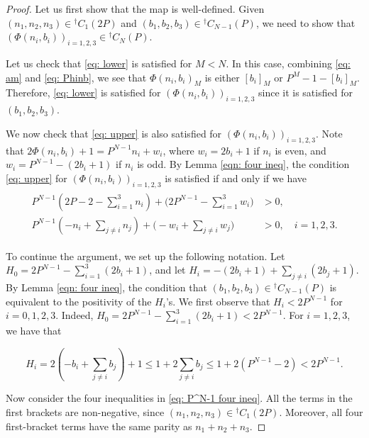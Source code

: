 \documentclass[10pt,a4paper]{amsart}
\begin{document}
\begin{proof}
    Let us first show that the map is well-defined.
    Given $(n_1,n_2,n_3)\in {}^\dagger C_1(2P)$ and $(b_1,b_2,b_3)\in {}^\dagger C_{N-1}(P)$, we need to show that $(\Phi(n_i,b_i))_{i=1,2,3}\in {}^\dagger C_N(P)$.

    Let us check that \eqref{eq: lower} is satisfied for $M<N$.
    In this case, combining \eqref{eq: am} and \eqref{eq: Phinb}, we see that $\Phi(n_i,b_i)_M$ is either $[b_i]_M$ or $P^M-1-[b_i]_M$.
    Therefore, \eqref{eq: lower} is satisfied for $(\Phi(n_i,b_i))_{i=1,2,3}$ since it is satisfied for $(b_1,b_2,b_3)$. 
    

    We now check that \eqref{eq: upper} is also satisfied for $(\Phi(n_i,b_i))_{i=1,2,3}$.
Note that  $2\Phi(n_i,b_i)+1=P^{N-1}n_i+w_i$, where $w_i=2b_i+1$ if $n_i$ is even, and $w_i=P^{N-1}-(2b_i+1)$ if $n_i$ is odd.
By Lemma \ref{eqn: four ineq}, the condition \eqref{eq: upper} for $(\Phi(n_i,b_i))_{i=1,2,3}$ is satisfied if and only if we have 
\begin{align}\label{eq: P^N-1 four ineq}
\begin{split}
    P^{N-1}(2P-2-\sum_{i=1}^3 n_i)+\Big(2P^{N-1}-\sum_{i=1}^3 w_i\Big)&>0,\\
    P^{N-1}(-n_i+\sum_{j\neq i}n_j)+\Big(-w_i+\sum_{j\neq i}w_j\Big)&>0,\quad i=1,2,3.
\end{split}
\end{align}


To continue the argument, we set up the following notation.
Let $H_0=2P^{N-1}-\sum_{i=1}^3(2b_i+1)$, and let $H_i=-(2b_i+1)+\sum_{j\neq i}(2b_j+1)$. 
By Lemma \ref{eqn: four ineq}, the condition that $(b_1,b_2,b_3)\in {}^\dagger C_{N-1}(P)$ is equivalent to the positivity of the $H_i$'s.
We first observe that $H_i<2P^{N-1}$ for $i=0,1,2,3$.  Indeed, $H_0=2P^{N-1}-\sum_{i=1}^3(2b_i+1)<2P^{N-1}$.
For $i=1,2,3$, we have that

\[H_i=2(-b_i+\sum_{j\neq i}b_j)+1\leq 1+2\sum_{j\neq i}b_j\leq 1+2(P^{N-1}-2)<2P^{N-1}.\]

Now consider the four inequalities in \eqref{eq: P^N-1 four ineq}.
All the terms in the first brackets are non-negative, since
$(n_1,n_2,n_3)\in{}^\dagger C_1(2P)$.
Moreover, all four first-bracket terms
have the same parity as $n_1+n_2+n_3$.


\end{proof}
\end{document}
